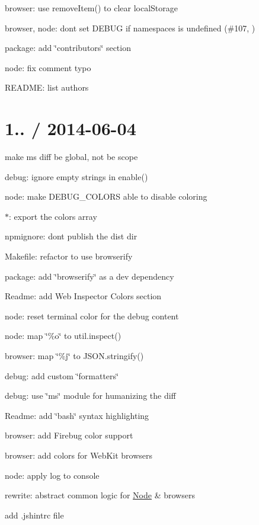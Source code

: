 \begin{DoxyItemize}
\item browser\+: use {\ttfamily remove\+Item()} to clear local\+Storage
\item browser, node\+: don\textquotesingle{}t set D\+E\+B\+UG if namespaces is undefined (\#107, )
\item package\+: add \char`\"{}contributors\char`\"{} section
\item node\+: fix comment typo
\item R\+E\+A\+D\+ME\+: list authors
\end{DoxyItemize}

\section*{1.. / 2014-\/06-\/04 }


\begin{DoxyItemize}
\item make ms diff be global, not be scope
\item debug\+: ignore empty strings in enable()
\item node\+: make D\+E\+B\+U\+G\+\_\+\+C\+O\+L\+O\+RS able to disable coloring
\item $\ast$\+: export the {\ttfamily colors} array
\item npmignore\+: don\textquotesingle{}t publish the {\ttfamily dist} dir
\item Makefile\+: refactor to use browserify
\item package\+: add \char`\"{}browserify\char`\"{} as a dev dependency
\item Readme\+: add Web Inspector Colors section
\item node\+: reset terminal color for the debug content
\item node\+: map \char`\"{}\%o\char`\"{} to {\ttfamily util.\+inspect()}
\item browser\+: map \char`\"{}\%j\char`\"{} to {\ttfamily J\+S\+O\+N.\+stringify()}
\item debug\+: add custom \char`\"{}formatters\char`\"{}
\item debug\+: use \char`\"{}ms\char`\"{} module for humanizing the diff
\item Readme\+: add \char`\"{}bash\char`\"{} syntax highlighting
\item browser\+: add Firebug color support
\item browser\+: add colors for Web\+Kit browsers
\item node\+: apply log to {\ttfamily console}
\item rewrite\+: abstract common logic for \mbox{\hyperlink{classNode}{Node}} \& browsers
\item add .jshintrc file
\end{DoxyItemize}

